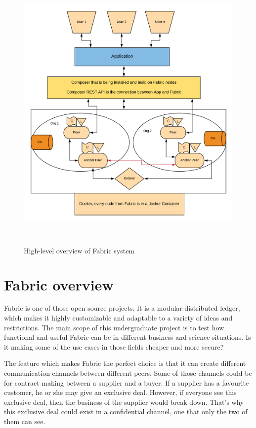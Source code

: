 \documentclass[a4paper,11pt]{report}
\begin{document}
\begin{figure}[h]
\centering
  \includegraphics[height=14cm,width=16cm]{Flowdiagram.png}
  \caption{High-level overview of Fabric system}
  \label{highleveloverview}
\end{figure}


\section{Fabric overview}
	Fabric is one of those open source projects. It is a modular distributed ledger, which makes it highly customizable and adaptable to a variety of ideas and restrictions. The main scope of this undergraduate project is to test how functional and useful Fabric can be in different business and science situations. Is it making some of the use cases in those fields cheaper and more secure?
	
The feature which makes Fabric the perfect choice is that it can create different communication channels between different peers. Some of those channels could be for contract making between a supplier and a buyer. If a supplier has a favourite customer, he or she may give an exclusive deal. However, if everyone see this exclusive deal, then the business of the supplier would break down. That’s why this exclusive deal could exist in a confidential channel, one that only the two of them can see. 
\end{document}
